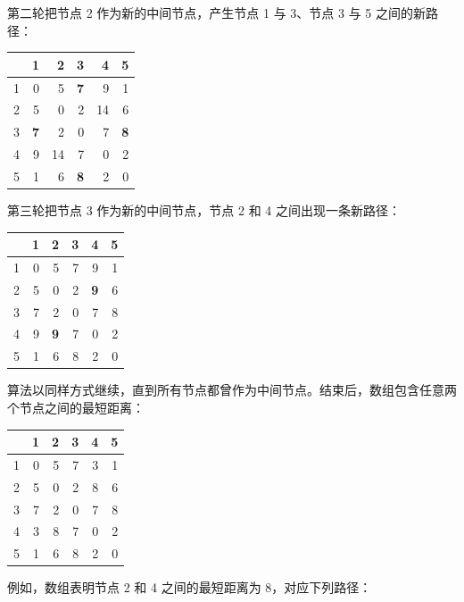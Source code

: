 第二轮把节点 2 作为新的中间节点，产生节点 1 与 3、节点 3 与 5 之间的新路径：

\begin{center}
\begin{tabular}{r|rrrrr}
 & 1 & 2 & 3 & 4 & 5 \\
\hline
1 & 0 & 5 & \textbf{7} & 9 & 1 \\
2 & 5 & 0 & 2 & 14 & 6 \\
3 & \textbf{7} & 2 & 0 & 7 & \textbf{8} \\
4 & 9 & 14 & 7 & 0 & 2 \\
5 & 1 & 6 & \textbf{8} & 2 & 0 \\
\end{tabular}
\end{center}
\vspace{10pt}

第三轮把节点 3 作为新的中间节点，节点 2 和 4 之间出现一条新路径：

\begin{center}
\begin{tabular}{r|rrrrr}
 & 1 & 2 & 3 & 4 & 5 \\
\hline
1 & 0 & 5 & 7 & 9 & 1 \\
2 & 5 & 0 & 2 & \textbf{9} & 6 \\
3 & 7 & 2 & 0 & 7 & 8 \\
4 & 9 & \textbf{9} & 7 & 0 & 2 \\
5 & 1 & 6 & 8 & 2 & 0 \\
\end{tabular}
\end{center}
\vspace{10pt}

算法以同样方式继续，直到所有节点都曾作为中间节点。结束后，数组包含任意两个节点之间的最短距离：

\begin{center}
\begin{tabular}{r|rrrrr}
 & 1 & 2 & 3 & 4 & 5 \\
\hline
1 & 0 & 5 & 7 & 3 & 1 \\
2 & 5 & 0 & 2 & 8 & 6 \\
3 & 7 & 2 & 0 & 7 & 8 \\
4 & 3 & 8 & 7 & 0 & 2 \\
5 & 1 & 6 & 8 & 2 & 0 \\
\end{tabular}
\end{center}

例如，数组表明节点 2 和 4 之间的最短距离为 8，对应下列路径：

